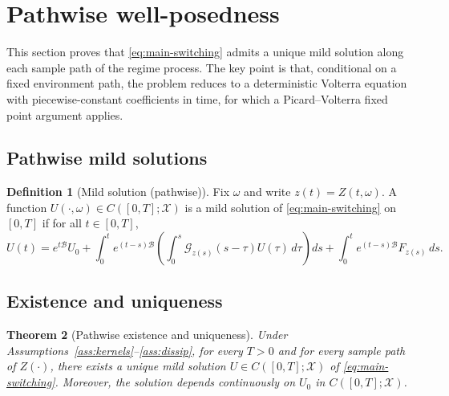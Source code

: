\documentclass[12pt,a4paper]{article}
\theoremstyle{plain}
\newtheorem{theorem}{Theorem}[section]
\theoremstyle{definition}
\newtheorem{definition}[theorem]{Definition}
\theoremstyle{remark}
\begin{document}
\section{Pathwise well-posedness}
\label{sec:wp}

This section proves that \eqref{eq:main-switching} admits a unique mild solution
along each sample path of the regime process. The key point is that, conditional
on a fixed environment path, the problem reduces to a deterministic Volterra
equation with piecewise-constant coefficients in time, for which a Picard--Volterra
fixed point argument applies.

\subsection{Pathwise mild solutions}
\label{subsec:mild}

\begin{definition}[Mild solution (pathwise)]
	\label{def:mild}
	Fix $\omega$ and write $z(t)=Z(t,\omega)$. A function
	$U(\cdot,\omega)\in C([0,T];\mathcal X)$ is a mild solution of
	\eqref{eq:main-switching} on $[0,T]$ if for all $t\in[0,T]$,
	\begin{equation}
		\label{eq:mild}
		U(t)
		=
		e^{t\mathcal{B}}U_0
		+
		\int_0^t e^{(t-s)\mathcal{B}}
		\left(
		\int_0^s \mathcal{G}_{z(s)}(s-\tau)U(\tau)\,d\tau
		\right) ds
		+
		\int_0^t e^{(t-s)\mathcal{B}}F_{z(s)}\,ds .
	\end{equation}
\end{definition}

\subsection{Existence and uniqueness}

\begin{theorem}[Pathwise existence and uniqueness]
	\label{thm:pathwise-wp}
	Under Assumptions~\ref{ass:kernels}--\ref{ass:dissip}, for every $T>0$ and for
	every sample path of $Z(\cdot)$, there exists a unique mild solution
	$U\in C([0,T];\mathcal{X})$ of \eqref{eq:main-switching}.
	Moreover, the solution depends continuously on $U_0$ in $C([0,T];\mathcal X)$.
\end{theorem}
\end{document}
